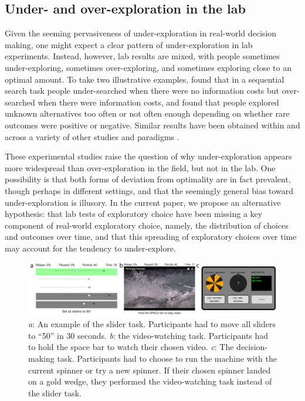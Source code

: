 \documentclass[10pt,letterpaper]{article}
\begin{document}
\subsection{Under- and over-exploration in the lab}

Given the seeming pervasiveness of under-exploration in real-world decision
making, one might expect a clear pattern of under-exploration in lab
experiments. Instead, however, lab results are mixed, with people sometimes
under-exploring, sometimes over-exploring, and sometimes exploring close to an
optimal amount. To take two illustrative examples, \citet{Zwick2003} found that
in a sequential search task people under-searched when there were no information
costs but over-searched when there were information costs, and
\citet{Teodorescu2014} found that people explored unknown alternatives too often
or not often enough depending on whether rare outcomes were positive or
negative. Similar results have been obtained within and across a variety of
other studies and paradigms
\citep{tversky1966information, Busemeyer1988, hertwig2004decisions, Navarro2016, Juni2016, Sang2011}.

These experimental studies raise the question of why under-exploration appears
more widespread than over-exploration in the field, but not in the lab. One
possibility is that both forms of deviation from optimality are in fact
prevalent, though perhaps in different settings, and that the seemingly general bias
toward under-exploration is illusory. In the current paper, we propose an
alternative hypothesis: that lab tests of exploratory choice have been missing a key component
of real-world exploratory choice, namely, the distribution of choices and
outcomes over time, and that this spreading of exploratory choices over time may
account for the tendency to under-explore.

\begin{figure}
\centering
\includegraphics[width=\textwidth]{figures/taskpictures.png}
\caption{\emph{a}: An example of the slider task. Participants had to move all
  sliders to ``50'' in 30 seconds. \emph{b}: the video-watching task.
  Participants had to hold the space bar to watch their chosen video. \emph{c}:
  The decision-making task. Participants had to choose to run the machine with
  the current spinner or try a new spinner. If their chosen spinner landed on
  a gold wedge, they performed the video-watching task instead of the
  slider task.}
\label{fig:taskpictures}
\end{figure}
\end{document}
